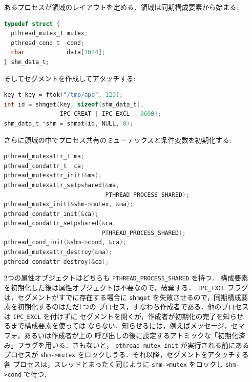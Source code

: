 \documentclass[../main.tex]{subfiles}
\begin{document}
\begin{example}
  \label{ex:l09-pshared}
  あるプロセスが領域のレイアウトを定める．領域は同期構成要素から始まる:
  \begin{lstlisting}[language=C, numbers=none]
typedef struct {
  pthread_mutex_t mutex;
  pthread_cond_t  cond;
  char            data[1024];
} shm_data_t;
\end{lstlisting}
  そしてセグメントを作成してアタッチする:
  \begin{lstlisting}[language=C, numbers=none]
key_t key = ftok("/tmp/app", 120);
int id = shmget(key, sizeof(shm_data_t),
                IPC_CREAT | IPC_EXCL | 0600);
shm_data_t *shm = shmat(id, NULL, 0);
\end{lstlisting}
  さらに領域の中でプロセス共有のミューテックスと条件変数を初期化する:
  \begin{lstlisting}[language=C, numbers=none]
pthread_mutexattr_t ma;
pthread_condattr_t  ca;
pthread_mutexattr_init(&ma);
pthread_mutexattr_setpshared(&ma,
                             PTHREAD_PROCESS_SHARED);
pthread_mutex_init(&shm->mutex, &ma);
pthread_condattr_init(&ca);
pthread_condattr_setpshared(&ca,
                            PTHREAD_PROCESS_SHARED);
pthread_cond_init(&shm->cond, &ca);
pthread_mutexattr_destroy(&ma);
pthread_condattr_destroy(&ca);
\end{lstlisting}
  2つの属性オブジェクトはどちらも \texttt{PTHREAD\_PROCESS\_SHARED} を持つ．
  構成要素を初期化した後は属性オブジェクトは不要なので，破棄する．%
  \allowbreak
  \texttt{IPC\_EXCL} フラグは，セグメントがすでに存在する場合に
  \texttt{shmget} を失敗させるので，同期構成要素を初期化するのはただ1つの
  プロセス，すなわち作成者である．他のプロセスは \texttt{IPC\_EXCL} を付けずに
  セグメントを開くが，作成者が初期化の完了を知らせるまで構成要素を使っては
  ならない．知らせるには，例えばメッセージ，セマフォ，あるいは作成者が上の
  呼び出しの後に設定するアトミックな「初期化済み」フラグを用いる．さもないと，
  \texttt{pthread\_mutex\_init} が実行される前にあるプロセスが
  \texttt{shm->mutex} をロックしうる．それ以降，セグメントをアタッチする各
  プロセスは，スレッドとまったく同じように \texttt{shm->mutex} をロックし
  \texttt{shm->cond} で待つ．
\end{example}
\end{document}
